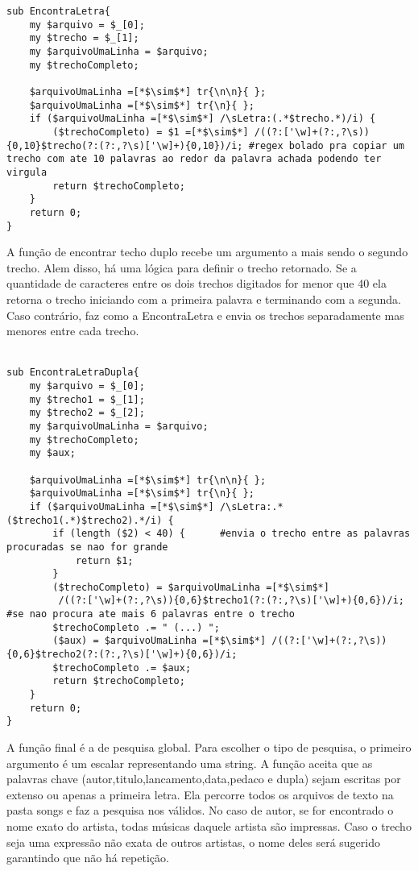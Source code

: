 \documentclass[12pt]{article}
\begin{document}
\begin{lstlisting}
sub EncontraLetra{
	my $arquivo = $_[0];
	my $trecho = $_[1];
	my $arquivoUmaLinha = $arquivo;
	my $trechoCompleto;
	
	$arquivoUmaLinha =[*$\sim$*] tr{\n\n}{ };
	$arquivoUmaLinha =[*$\sim$*] tr{\n}{ };
	if ($arquivoUmaLinha =[*$\sim$*] /\sLetra:(.*$trecho.*)/i) {
		($trechoCompleto) = $1 =[*$\sim$*] /((?:['\w]+(?:,?\s)){0,10}$trecho(?:(?:,?\s)['\w]+){0,10})/i; #regex bolado pra copiar um trecho com ate 10 palavras ao redor da palavra achada podendo ter virgula
		return $trechoCompleto;
	}
	return 0;
}
\end{lstlisting}
A função de encontrar techo duplo recebe um argumento a mais sendo o segundo trecho. Alem disso, há uma lógica para definir o trecho retornado. Se a quantidade de caracteres entre os dois trechos digitados for menor que 40 ela retorna o trecho iniciando com a primeira palavra e terminando com a segunda. Caso contrário, faz como a EncontraLetra e envia os trechos separadamente mas menores entre cada trecho.\\\\
\begin{lstlisting} 
sub EncontraLetraDupla{
	my $arquivo = $_[0];
	my $trecho1 = $_[1];
	my $trecho2 = $_[2];
	my $arquivoUmaLinha = $arquivo;
	my $trechoCompleto;
	my $aux;
	
	$arquivoUmaLinha =[*$\sim$*] tr{\n\n}{ };
	$arquivoUmaLinha =[*$\sim$*] tr{\n}{ };
	if ($arquivoUmaLinha =[*$\sim$*] /\sLetra:.*($trecho1(.*)$trecho2).*/i) {
		if (length ($2) < 40) {      #envia o trecho entre as palavras procuradas se nao for grande
			return $1;
		}
		($trechoCompleto) = $arquivoUmaLinha =[*$\sim$*]
		 /((?:['\w]+(?:,?\s)){0,6}$trecho1(?:(?:,?\s)['\w]+){0,6})/i; #se nao procura ate mais 6 palavras entre o trecho
		$trechoCompleto .= " (...) ";
		($aux) = $arquivoUmaLinha =[*$\sim$*] /((?:['\w]+(?:,?\s)){0,6}$trecho2(?:(?:,?\s)['\w]+){0,6})/i;
		$trechoCompleto .= $aux;
		return $trechoCompleto;
	}
	return 0;
}
\end{lstlisting}
A função final é a de pesquisa global. Para escolher o tipo de pesquisa, o primeiro argumento é um escalar representando uma string. A função aceita que as palavras chave (autor,titulo,lancamento,data,pedaco e dupla) sejam escritas por extenso ou apenas a primeira letra. Ela percorre todos os arquivos de texto na pasta songs e faz a pesquisa nos válidos. No caso de autor, se for encontrado o nome exato do artista, todas músicas daquele artista são impressas. Caso o trecho seja uma expressão não exata de outros artistas, o nome deles será sugerido garantindo que não há repetição.
\end{document}
